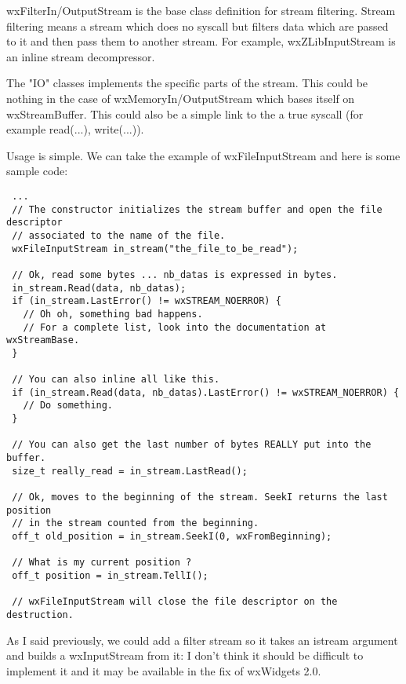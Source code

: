 wxFilterIn/OutputStream is the base class definition for stream filtering.
Stream filtering means a stream which does no syscall but filters data
which are passed to it and then pass them to another stream.
For example, wxZLibInputStream is an inline stream decompressor.

The "IO" classes implements the specific parts of the stream. This could be
nothing in the case of wxMemoryIn/OutputStream which bases itself on
wxStreamBuffer. This could also be a simple link to the a true syscall
(for example read(...), write(...)).


Usage is simple. We can take the example of wxFileInputStream and here is some sample
code:

\begin{verbatim}
 ...
 // The constructor initializes the stream buffer and open the file descriptor
 // associated to the name of the file.
 wxFileInputStream in_stream("the_file_to_be_read");

 // Ok, read some bytes ... nb_datas is expressed in bytes.
 in_stream.Read(data, nb_datas);
 if (in_stream.LastError() != wxSTREAM_NOERROR) {
   // Oh oh, something bad happens.
   // For a complete list, look into the documentation at wxStreamBase.
 }

 // You can also inline all like this.
 if (in_stream.Read(data, nb_datas).LastError() != wxSTREAM_NOERROR) {
   // Do something.
 }

 // You can also get the last number of bytes REALLY put into the buffer.
 size_t really_read = in_stream.LastRead();

 // Ok, moves to the beginning of the stream. SeekI returns the last position 
 // in the stream counted from the beginning.
 off_t old_position = in_stream.SeekI(0, wxFromBeginning);
 
 // What is my current position ?
 off_t position = in_stream.TellI();

 // wxFileInputStream will close the file descriptor on the destruction.
\end{verbatim}


As I said previously, we could add a filter stream so it takes an istream
argument and builds a wxInputStream from it: I don't think it should 
be difficult to implement it and it may be available in the fix of wxWidgets 2.0.

